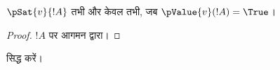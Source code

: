 \documentclass[../../../include/open-logic-section]{subfiles}
\begin{document}
\begin{prop}
  $\pSat{v}{!A}$ तभी और केवल तभी, जब $\pValue{v}(!A) = \True$।
\end{prop}

\begin{proof}
  $!A$ पर आगमन द्वारा।
\end{proof}

\begin{prob}
   सिद्ध करें।
\end{prob}
\end{document}
